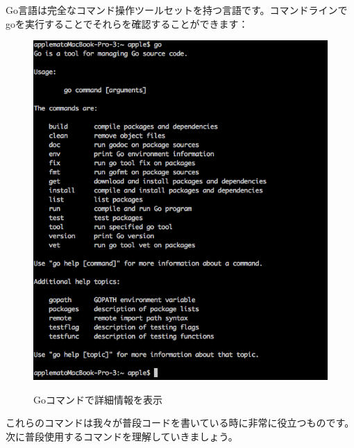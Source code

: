 Go言語は完全なコマンド操作ツールセットを持つ言語です。コマンドラインでgoを実行することでそれらを確認することができます：

\begin{figure}[H]
   \includegraphics[width=14cm]{1.1.mac.png}
   \label{図1.3}
   \caption{Goコマンドで詳細情報を表示}
\end{figure}

これらのコマンドは我々が普段コードを書いている時に非常に役立つものです。次に普段使用するコマンドを理解していきましょう。

